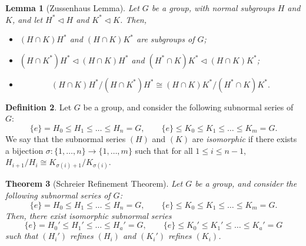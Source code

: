 \documentclass[a4paper, openany]{memoir}
\theoremstyle{definition}
\newtheorem{definition}{Definition}[section]
\theoremstyle{plain}
\newtheorem{theorem}[definition]{Theorem}
\newtheorem{lemma}[definition]{Lemma}
\begin{document}
    \begin{lemma}[Zussenhaus Lemma]
        Let $G$ be a group, with normal subgroups $H$ and $K$, and let $H^* \vartriangleleft H$ and $K^* \vartriangleleft K$. Then,
        \begin{itemize}
            \item $(H \cap K)H^*$ and $(H \cap K)K^*$ are subgroups of $G$;
            \item $(H \cap K^*)H^* \vartriangleleft (H \cap K)H^*$ and $(H^* \cap K)K^* \vartriangleleft (H \cap K)K^*$;
            \item \[ (H \cap K)H^* / (H \cap K^*)H^* \cong (H \cap K)K^* / (H^* \cap K)K^*.\]
        \end{itemize}
    \end{lemma}
    \begin{definition}
        Let $G$ be a group, and consider the following subnormal series of $G$:
        \[\{e\} = H_0 \leq H_1 \leq \dots \leq H_n = G, \qquad \{e\} \leq K_0 \leq K_1 \leq \dots \leq K_m = G.\]
        We say that the subnormal series $(H)$ and $(K)$ are \emph{isomorphic} if there exists a bijection $\sigma: \{1, \dots, n\} \to \{1, \dots, m\}$ such that for all $1 \leq i \leq n-1$, $H_{i+1}/H_i \cong K_{\sigma(i)+1}/K_{\sigma(i)}$.
    \end{definition}

    \begin{theorem}[Schreier Refinement Theorem]
        Let $G$ be a group, and consider the following subnormal series of $G$:
        \[\{e\} = H_0 \leq H_1 \leq \dots \leq H_n = G, \qquad \{e\} \leq K_0 \leq K_1 \leq \dots \leq K_m = G.\]
        Then, there exist isomorphic subnormal series
        \[\{e\} = H_0' \leq H_1' \leq \dots \leq H_a' = G, \qquad \{e\} \leq K_0' \leq K_1' \leq \dots \leq K_a' = G\]
        such that $(H_i')$ refines $(H_i)$ and $(K_i')$ refines $(K_i)$.        
    \end{theorem}
\end{document}
